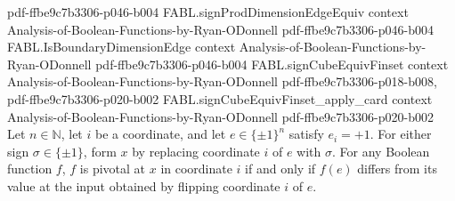\begin{theorem}
  {pdf-ffbe9c7b3306-p046-b004}
\proofstep
  {FABL.signProdDimensionEdgeEquiv}
  {context}
  {Analysis-of-Boolean-Functions-by-Ryan-ODonnell}
  {pdf-ffbe9c7b3306-p046-b004}
\proofstep
  {FABL.IsBoundaryDimensionEdge}
  {context}
  {Analysis-of-Boolean-Functions-by-Ryan-ODonnell}
  {pdf-ffbe9c7b3306-p046-b004}
\proofstep
  {FABL.signCubeEquivFinset}
  {context}
  {Analysis-of-Boolean-Functions-by-Ryan-ODonnell}
  {pdf-ffbe9c7b3306-p018-b008,
    pdf-ffbe9c7b3306-p020-b002}
\proofstep
  {FABL.signCubeEquivFinset_apply_card}
  {context}
  {Analysis-of-Boolean-Functions-by-Ryan-ODonnell}
  {pdf-ffbe9c7b3306-p020-b002}
Let $n\in\mathbb N$, let $i$ be a coordinate, and let $e\in\{\pm1\}^n$ satisfy $e_i=+1$.
For either sign $\sigma\in\{\pm1\}$, form $x$ by replacing coordinate $i$ of $e$ with
$\sigma$. For any Boolean function $f$, $f$ is pivotal at $x$ in coordinate $i$ if and
only if $f(e)$ differs from its value at the input obtained by flipping coordinate $i$
of $e$.
\end{theorem}

